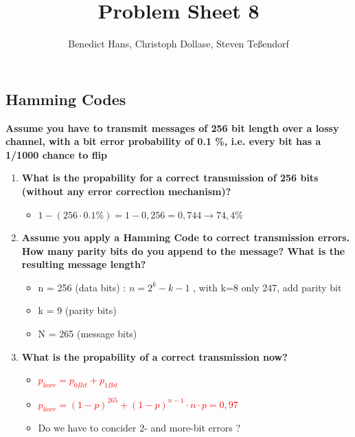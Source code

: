 \documentclass[a4paper,12pt]{article}
\author{Benedict Hans, Christoph Dollase, Steven Te\ss endorf}
\title{ \textbf{Problem Sheet 8}}
\newcommand*\red[1]{\textcolor{red}{#1}}
\begin{document}
	 
	\maketitle	 %
	
	\subsection{Hamming Codes}
	\textbf{Assume you have to transmit messages of 256 bit length over a lossy channel, with a bit error probability of 0.1 \%, i.e.  every bit has a 1/1000 chance to flip}
	\begin{enumerate}[label=(\roman*),itemsep=0pt]
		\item \textbf{What is the propability for a correct transmission of 256 bits (without any error correction mechanism)?}
		\begin{itemize}[itemsep=0pt]
			\item $1 - (256 \cdot 0.1\%) = 1 - 0,256 = 0,744 \rightarrow  74,4\%$
			
		\end{itemize}
		\item \textbf{Assume you apply a Hamming Code to correct transmission errors. How many parity bits do you append to the message?  What is the resulting message length?}
		\begin{itemize}[itemsep=0pt]
			\item n = 256 (data bits) : $n = 2^k - k - 1$ , with k=8 only 247, add parity bit
			\item k = 9 (parity bits)
			\item N = 265 (message bits)
		\end{itemize}
		\item \textbf{What is the propability of a correct transmission now?}
		\begin{itemize}[itemsep=0pt]
			\item \red{$p_{korr} = p_{0Bit} + p_{1Bit} $}
			\item \red{$p_{korr} = (1-p)^{265} + (1-p)^{n-1} \cdot n \cdot p = 0,97$}
			\item Do we have to concider 2- and more-bit errors ?
		\end{itemize}
	\end{enumerate}

	
\end{document}
